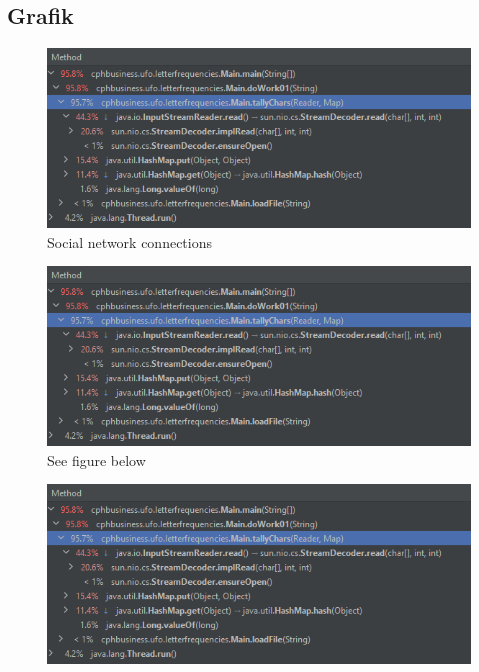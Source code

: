 \documentclass{article}
\begin{document}
\begin{enumerate}
\section{Grafik}
    \begin{figure}[h!]
        \begin{center}            
            \includegraphics[scale=.5]{images/profiler1.png}            
            \caption{Social network connections}
            \label{fig:1}
        \end{center}
    \end{figure}
    \begin{figure}[h!]
        \begin{center}
            \caption{See figure below}
            \includegraphics[scale=.5]{images/profiler1.png}
        \end{center}
    \end{figure}
    \begin{figure}[htb!]
        \begin{minipage}[t]{.5\textwidth}
            \centering
            \includegraphics[scale=.5]{images/profiler1.png}            

\end{minipage}
\end{figure}
\end{enumerate}
\end{document}
